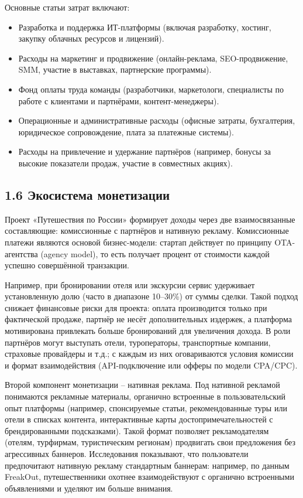 \noindent Основные статьи затрат включают:
\begin{itemize}
    \item Разработка и поддержка ИТ-платформы (включая разработку, хостинг, закупку облачных ресурсов и лицензий).
    \item Расходы на маркетинг и продвижение (онлайн-реклама, SEO-продвижение, SMM, участие в выставках, партнерские программы).
    \item Фонд оплаты труда команды (разработчики, маркетологи, специалисты по работе с клиентами и партнёрами, контент-менеджеры).
    \item Операционные и административные расходы (офисные затраты, бухгалтерия, юридическое сопровождение, плата за платежные системы).
    \item Расходы на привлечение и удержание партнёров (например, бонусы за высокие показатели продаж, участие в совместных акциях).
\end{itemize}

\subsection*{1.6 Экосистема монетизации}
Проект «Путешествия по России» формирует доходы через две взаимосвязанные составляющие: комиссионные с партнёров и нативную рекламу. Комиссионные платежи являются основой бизнес-модели: стартап действует по принципу OTA-агентства (agency model), то есть получает процент от стоимости каждой успешно совершённой транзакции. 

Например, при бронировании отеля или экскурсии сервис удерживает установленную долю (часто в диапазоне 10–30\%) от суммы сделки. Такой подход снижает финансовые риски для проекта: оплата производится только при фактической продаже, партнёр не несёт дополнительных издержек, а платформа мотивирована привлекать больше бронирований для увеличения дохода. В роли партнёров могут выступать отели, туроператоры, транспортные компании, страховые провайдеры и т.д.; с каждым из них оговариваются условия комиссии и формат взаимодействия (API-подключение или офферы по модели CPA/CPC).

Второй компонент монетизации – нативная реклама. Под нативной рекламой понимаются рекламные материалы, органично встроенные в пользовательский опыт платформы (например, спонсируемые статьи, рекомендованные туры или отели в списках контента, интерактивные карты достопримечательностей с брендированными подсказками). Такой формат позволяет рекламодателям (отелям, турфирмам, туристическим регионам) продвигать свои предложения без агрессивных баннеров. Исследования показывают, что пользователи предпочитают нативную рекламу стандартным баннерам: например, по данным FreakOut, путешественники охотнее взаимодействуют с органично встроенными объявлениями и уделяют им больше внимания. 

